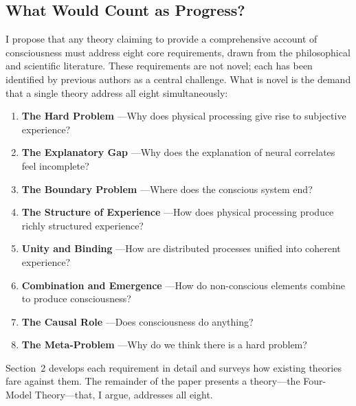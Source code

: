 \documentclass[12pt]{article}
\begin{document}
\subsection{What Would Count as Progress?}

I propose that any theory claiming to provide a comprehensive account of consciousness must address eight core requirements, drawn from the philosophical and scientific literature. These requirements are not novel; each has been identified by previous authors as a central challenge. What is novel is the demand that a single theory address all eight simultaneously:

\begin{enumerate}
\item \textbf{The Hard Problem} \citep{Chalmers1995}---\hspace{0pt}Why does physical processing give rise to subjective experience?
\item \textbf{The Explanatory Gap} \citep{Levine1983}---\hspace{0pt}Why does the explanation of neural correlates feel incomplete?
\item \textbf{The Boundary Problem} \citep{Bayne2010,Tononi2004}---\hspace{0pt}Where does the conscious system end?
\item \textbf{The Structure of Experience} \citep{Nagel1974}---\hspace{0pt}How does physical processing produce richly structured experience?
\item \textbf{Unity and Binding} \citep{Treisman1980,Revonsuo1999}---\hspace{0pt}How are distributed processes unified into coherent experience?
\item \textbf{Combination and Emergence} \citep{Chalmers2016}---\hspace{0pt}How do non-conscious elements combine to produce consciousness?
\item \textbf{The Causal Role} \citep{Jackson1982}---\hspace{0pt}Does consciousness do anything?
\item \textbf{The Meta-Problem} \citep{Chalmers2018}---\hspace{0pt}Why do we think there is a hard problem?
\end{enumerate}

Section~2 develops each requirement in detail and surveys how existing theories fare against them. The remainder of the paper presents a theory---\hspace{0pt}the Four-Model Theory---\hspace{0pt}that, I argue, addresses all eight.
\end{document}
